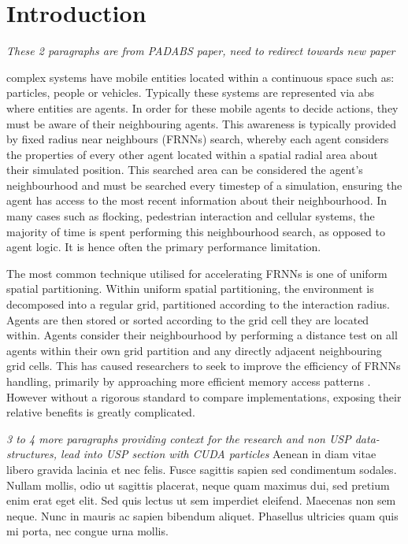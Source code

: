 \section{Introduction}
  \textit{These 2 paragraphs are from PADABS paper, need to redirect towards new paper}
  
   complex systems have mobile entities located within a continuous space such as: particles, people or vehicles. Typically these systems are represented via \gls{abs} where entities are agents. In order for these mobile agents to decide actions, they must be aware of their neighbouring agents. This awareness is typically provided by fixed radius near neighbours (FRNNs) search, whereby each agent considers the properties of every other agent located within a spatial radial area about their simulated position. This searched area can be considered the agent's neighbourhood and must be searched every timestep of a simulation, ensuring the agent has access to the most recent information about their neighbourhood. In many cases such as flocking, pedestrian interaction and cellular systems, the majority of time is spent performing this neighbourhood search, as opposed to agent logic. It is hence often the primary performance limitation.
  
  The most common technique utilised for accelerating FRNNs is one of uniform spatial partitioning. Within uniform spatial partitioning, the environment is decomposed into a regular grid, partitioned according to the interaction radius. Agents are then stored or sorted according to the grid cell they are located within. Agents consider their neighbourhood by performing a distance test on all agents within their own grid partition and any directly adjacent neighbouring grid cells. This has caused researchers to seek to improve the efficiency of FRNNs handling, primarily by approaching more efficient memory access patterns \cite{GS*10,Hoe14,HY*15}. However without a rigorous standard to compare implementations, exposing their relative benefits is greatly complicated.
  
  \textit{3 to 4 more paragraphs providing context for the research and non USP data-structures, lead into USP section with CUDA particles}
Aenean in diam vitae libero gravida lacinia et nec felis. Fusce sagittis sapien sed condimentum sodales. Nullam mollis, odio ut sagittis placerat, neque quam maximus dui, sed pretium enim erat eget elit. Sed quis lectus ut sem imperdiet eleifend. Maecenas non sem neque. Nunc in mauris ac sapien bibendum aliquet. Phasellus ultricies quam quis mi porta, nec congue urna mollis.

